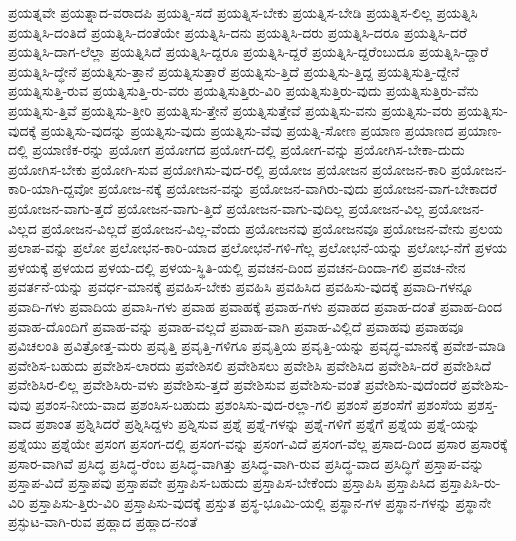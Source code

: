 {ಪ್ರಯತ್ನವೇ
ಪ್ರಯತ್ನಾದ-ವರಾದಪಿ
ಪ್ರಯತ್ನಿ-ಸದೆ
ಪ್ರಯತ್ನಿಸ-ಬೇಕು
ಪ್ರಯತ್ನಿಸ-ಬೇಡಿ
ಪ್ರಯತ್ನಿಸ-ಲಿಲ್ಲ
ಪ್ರಯತ್ನಿಸಿ
ಪ್ರಯತ್ನಿಸಿ-ದಂತಿದೆ
ಪ್ರಯತ್ನಿಸಿ-ದಂತೆಯೇ
ಪ್ರಯತ್ನಿಸಿ-ದನು
ಪ್ರಯತ್ನಿಸಿ-ದರು
ಪ್ರಯತ್ನಿಸಿ-ದರೂ
ಪ್ರಯತ್ನಿಸಿ-ದರೆ
ಪ್ರಯತ್ನಿಸಿ-ದಾಗ-ಲೆಲ್ಲಾ
ಪ್ರಯತ್ನಿಸಿದೆ
ಪ್ರಯತ್ನಿಸಿ-ದ್ದರೂ
ಪ್ರಯತ್ನಿಸಿ-ದ್ದರೆ
ಪ್ರಯತ್ನಿಸಿ-ದ್ದರೆಂಬುದೂ
ಪ್ರಯತ್ನಿಸಿ-ದ್ದಾರೆ
ಪ್ರಯತ್ನಿಸಿ-ದ್ಧೇನೆ
ಪ್ರಯತ್ನಿಸು-ತ್ತಾನೆ
ಪ್ರಯತ್ನಿಸುತ್ತಾರೆ
ಪ್ರಯತ್ನಿಸು-ತ್ತಿದೆ
ಪ್ರಯತ್ನಿಸು-ತ್ತಿದ್ದ
ಪ್ರಯತ್ನಿಸುತ್ತಿ-ದ್ದೇನೆ
ಪ್ರಯತ್ನಿಸುತ್ತಿ-ರುವ
ಪ್ರಯತ್ನಿಸುತ್ತಿ-ರು-ವರು
ಪ್ರಯತ್ನಿಸುತ್ತಿರು-ವಿರಿ
ಪ್ರಯತ್ನಿಸುತ್ತಿರು-ವುದು
ಪ್ರಯತ್ನಿಸುತ್ತಿರು-ವೆನು
ಪ್ರಯತ್ನಿಸು-ತ್ತಿವೆ
ಪ್ರಯತ್ನಿಸು-ತ್ತೀರಿ
ಪ್ರಯತ್ನಿಸು-ತ್ತೇನೆ
ಪ್ರಯತ್ನಿಸುತ್ತೇವೆ
ಪ್ರಯತ್ನಿಸು-ವನು
ಪ್ರಯತ್ನಿಸು-ವರು
ಪ್ರಯತ್ನಿಸು-ವುದಕ್ಕೆ
ಪ್ರಯತ್ನಿಸು-ವುದನ್ನು
ಪ್ರಯತ್ನಿಸು-ವುದು
ಪ್ರಯತ್ನಿಸು-ವೆವು
ಪ್ರಯತ್ನಿ-ಸೋಣ
ಪ್ರಯಾಣ
ಪ್ರಯಾಣದ
ಪ್ರಯಾಣ-ದಲ್ಲಿ
ಪ್ರಯಾಣಿಕ-ರನ್ನು
ಪ್ರಯೋಗ
ಪ್ರಯೋಗದ
ಪ್ರಯೋಗ-ದಲ್ಲಿ
ಪ್ರಯೋಗ-ವನ್ನು
ಪ್ರಯೋಗಿಸ-ಬೇಕಾ-ದುದು
ಪ್ರಯೋಗಿಸ-ಬೇಕು
ಪ್ರಯೋಗಿ-ಸುವ
ಪ್ರಯೋಗಿಸು-ವುದ-ರಲ್ಲಿ
ಪ್ರಯೋಜ
ಪ್ರಯೋಜನ
ಪ್ರಯೋಜನ-ಕಾರಿ
ಪ್ರಯೋಜನ-ಕಾರಿ-ಯಾಗಿ-ದ್ದವೋ
ಪ್ರಯೋಜ-ನಕ್ಕೆ
ಪ್ರಯೋಜನ-ವನ್ನು
ಪ್ರಯೋಜನ-ವಾಗಿರು-ವುದು
ಪ್ರಯೋಜನ-ವಾಗ-ಬೇಕಾದರೆ
ಪ್ರಯೋಜನ-ವಾಗು-ತ್ತದೆ
ಪ್ರಯೋಜನ-ವಾಗು-ತ್ತಿದೆ
ಪ್ರಯೋಜನ-ವಾಗು-ವುದಿಲ್ಲ
ಪ್ರಯೋಜನ-ವಿಲ್ಲ
ಪ್ರಯೋಜನ-ವಿಲ್ಲದ
ಪ್ರಯೋಜನ-ವಿಲ್ಲದೆ
ಪ್ರಯೋಜನ-ವಿಲ್ಲ-ವೆಂದು
ಪ್ರಯೋಜನವು
ಪ್ರಯೋಜನವೂ
ಪ್ರಯೋಜನ-ವೇನು
ಪ್ರಲಯ
ಪ್ರಲಾಪ-ವನ್ನು
ಪ್ರಲೋ
ಪ್ರಲೋಭನ-ಕಾರಿ-ಯಾದ
ಪ್ರಲೋಭನೆ-ಗಳಿ-ಗೆಲ್ಲ
ಪ್ರಲೋಭನೆ-ಯನ್ನು
ಪ್ರಲೋಭ-ನೆಗೆ
ಪ್ರಳಯ
ಪ್ರಳಯಕ್ಕೆ
ಪ್ರಳಯದ
ಪ್ರಳಯ-ದಲ್ಲಿ
ಪ್ರಳಯ-ಸ್ಥಿತಿ-ಯಲ್ಲಿ
ಪ್ರವಚನ-ದಿಂದ
ಪ್ರವಚನ-ದಿಂದಾ-ಗಲಿ
ಪ್ರವಚ-ನೇನ
ಪ್ರವರ್ತನೆ-ಯನ್ನು
ಪ್ರವರ್ಧ-ಮಾನಕ್ಕೆ
ಪ್ರವಹಿಸ-ಬೇಕು
ಪ್ರವಹಿಸಿ
ಪ್ರವಹಿಸಿದ
ಪ್ರವಹಿಸು-ವುದಕ್ಕೆ
ಪ್ರವಾದಿ-ಗಳನ್ನೂ
ಪ್ರವಾದಿ-ಗಳು
ಪ್ರವಾದಿಯ
ಪ್ರವಾಸಿ-ಗಳು
ಪ್ರವಾಹ
ಪ್ರವಾಹಕ್ಕೆ
ಪ್ರವಾಹ-ಗಳು
ಪ್ರವಾಹದ
ಪ್ರವಾಹ-ದಂತೆ
ಪ್ರವಾಹ-ದಿಂದ
ಪ್ರವಾಹ-ದೊಂದಿಗೆ
ಪ್ರವಾಹ-ವನ್ನು
ಪ್ರವಾಹ-ವಲ್ಲದೆ
ಪ್ರವಾಹ-ವಾಗಿ
ಪ್ರವಾಹ-ವಿಲ್ಲಿದೆ
ಪ್ರವಾಹವು
ಪ್ರವಾಹವೂ
ಪ್ರವಿಚಲಂತಿ
ಪ್ರವಿತ್ರೋತ್ತ-ಮರು
ಪ್ರವೃತ್ತಿ
ಪ್ರವೃತ್ತಿ-ಗಳಿಗೂ
ಪ್ರವೃತ್ತಿಯ
ಪ್ರವೃತ್ತಿ-ಯನ್ನು
ಪ್ರವೃದ್ಧ-ಮಾನಕ್ಕೆ
ಪ್ರವೇಶ-ಮಾಡಿ
ಪ್ರವೇಶಿಸ-ಬಹುದು
ಪ್ರವೇಶಿಸ-ಲಾರದು
ಪ್ರವೇಶಿಸಲಿ
ಪ್ರವೇಶಿಸಲು
ಪ್ರವೇಶಿಸಿ
ಪ್ರವೇಶಿಸಿದ
ಪ್ರವೇಶಿಸಿ-ದರೆ
ಪ್ರವೇಶಿಸಿದೆ
ಪ್ರವೇಶಿಸಿರ-ಲಿಲ್ಲ
ಪ್ರವೇಶಿಸಿರು-ವಳು
ಪ್ರವೇಶಿಸು-ತ್ತದೆ
ಪ್ರವೇಶಿಸುವ
ಪ್ರವೇಶಿಸು-ವಂತೆ
ಪ್ರವೇಶಿಸು-ವುದೆಂದರೆ
ಪ್ರವೇಶಿಸು-ವುವು
ಪ್ರಶಂಸ-ನೀಯ-ವಾದ
ಪ್ರಶಂಸಿಸ-ಬಹುದು
ಪ್ರಶಂಸಿಸು-ವುದ-ರಲ್ಲಾ-ಗಲಿ
ಪ್ರಶಂಸೆ
ಪ್ರಶಂಸೆಗೆ
ಪ್ರಶಂಸೆಯ
ಪ್ರಶಸ್ತ-ವಾದ
ಪ್ರಶಾಂತ
ಪ್ರಶ್ನಿಸಿದರೆ
ಪ್ರಶ್ನಿಸಿದ್ದಳು
ಪ್ರಶ್ನಿಸುವ
ಪ್ರಶ್ನೆ
ಪ್ರಶ್ನೆ-ಗಳನ್ನು
ಪ್ರಶ್ನೆ-ಗಳಿಗೆ
ಪ್ರಶ್ನೆಗೆ
ಪ್ರಶ್ನೆಯ
ಪ್ರಶ್ನೆ-ಯನ್ನು
ಪ್ರಶ್ನೆಯು
ಪ್ರಶ್ನೆಯೇ
ಪ್ರಸಂಗ
ಪ್ರಸಂಗ-ದಲ್ಲಿ
ಪ್ರಸಂಗ-ವನ್ನು
ಪ್ರಸಂಗ-ವಿದೆ
ಪ್ರಸಂಗ-ವೆಲ್ಲ
ಪ್ರಸಾದ-ದಿಂದ
ಪ್ರಸಾರ
ಪ್ರಸಾರಕ್ಕೆ
ಪ್ರಸಾರ-ವಾಗಿವೆ
ಪ್ರಸಿದ್ಧ
ಪ್ರಸಿದ್ಧ-ರೆಂಬ
ಪ್ರಸಿದ್ಧ-ವಾಗಿತ್ತು
ಪ್ರಸಿದ್ಧ-ವಾಗಿ-ರುವ
ಪ್ರಸಿದ್ಧ-ವಾದ
ಪ್ರಸಿದ್ಧಿಗೆ
ಪ್ರಸ್ತಾಪ-ವನ್ನು
ಪ್ರಸ್ತಾಪ-ವಿದೆ
ಪ್ರಸ್ತಾಪವು
ಪ್ರಸ್ತಾಪವೇ
ಪ್ರಸ್ತಾಪಿಸ-ಬಹುದು
ಪ್ರಸ್ತಾಪಿಸ-ಬೇಕೆಂದು
ಪ್ರಸ್ತಾಪಿಸಿ
ಪ್ರಸ್ತಾಪಿಸಿದ
ಪ್ರಸ್ತಾಪಿಸಿ-ರು-ವಿರಿ
ಪ್ರಸ್ತಾಪಿಸು-ತ್ತಿರು-ವಿರಿ
ಪ್ರಸ್ತಾಪಿಸು-ವುದಕ್ಕೆ
ಪ್ರಸ್ತುತ
ಪ್ರಸ್ಥ-ಭೂಮಿ-ಯಲ್ಲಿ
ಪ್ರಸ್ಥಾನ-ಗಳ
ಪ್ರಸ್ಥಾನ-ಗಳನ್ನು
ಪ್ರಸ್ಥಾನೇ
ಪ್ರಸ್ಫುಟ-ವಾಗಿ-ರುವ
ಪ್ರಹ್ಲಾದ
ಪ್ರಹ್ಲಾದ-ನಂತೆ
}
